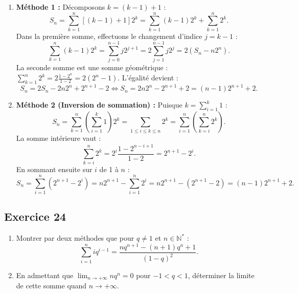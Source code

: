 \documentclass[11pt,a4paper]{article}
\newcommand{\N}{\mathbb{N}}
\begin{document}
\begin{correctionbox}
\begin{enumerate}
    \item \textbf{Méthode 1 :} Décomposons $k = (k-1) + 1$ :
    \[
    S_n = \sum_{k=1}^n [(k-1) + 1]2^k = \sum_{k=1}^n (k-1)2^k + \sum_{k=1}^n 2^k.
    \]
    Dans la première somme, effectuons le changement d'indice $j = k-1$ :
    \[
    \sum_{k=1}^n (k-1)2^k = \sum_{j=0}^{n-1} j 2^{j+1} = 2 \sum_{j=1}^{n-1} j 2^j = 2(S_n - n 2^n).
    \]
    La seconde somme est une somme géométrique : $\sum_{k=1}^n 2^k = 2 \frac{1 - 2^n}{1 - 2} = 2(2^n - 1)$.
    L'égalité devient :
    \[
    S_n = 2 S_n - 2n 2^n + 2^{n+1} - 2 \iff S_n = 2n 2^n - 2^{n+1} + 2 = (n-1)2^{n+1} + 2.
    \]
    \item \textbf{Méthode 2 (Inversion de sommation) :}
    Puisque $k = \sum_{i=1}^k 1$ :
    \[
    S_n = \sum_{k=1}^n \left(\sum_{i=1}^k 1\right) 2^k = \sum_{1 \le i \le k \le n} 2^k = \sum_{i=1}^n \left(\sum_{k=i}^n 2^k\right).
    \]
    La somme intérieure vaut :
    \[
    \sum_{k=i}^n 2^k = 2^i \frac{1 - 2^{n-i+1}}{1 - 2} = 2^{n+1} - 2^i.
    \]
    En sommant ensuite sur $i$ de 1 à $n$ :
    \[
    S_n = \sum_{i=1}^n (2^{n+1} - 2^i) = n 2^{n+1} - \sum_{i=1}^n 2^i = n 2^{n+1} - (2^{n+1} - 2) = (n-1)2^{n+1} + 2.
    \]
\end{enumerate}
\end{correctionbox}

\subsection*{Exercice 24}
\begin{enumerate}
    \item Montrer par deux méthodes que pour $q \ne 1$ et $n \in \N^*$ :
    \[
    \sum_{i=1}^n i q^{i-1} = \frac{n q^{n+1} - (n+1)q^n + 1}{(1-q)^2}.
    \]
    \item En admettant que $\lim_{n \to +\infty} n q^n = 0$ pour $-1 < q < 1$, déterminer la limite de cette somme quand $n \to +\infty$.
\end{enumerate}
\end{document}
